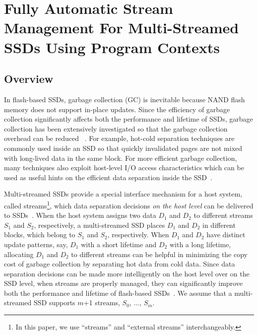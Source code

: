 \chapter{Fully Automatic Stream Management For Multi-Streamed SSDs Using Program Contexts} 
\label{chap:PCstream}

\section{Overview}

In flash-based SSDs, garbage collection (GC) is inevitable because NAND flash
memory does not support in-place updates.  Since the efficiency of garbage
collection significantly affects  both the performance and lifetime of SSDs,
garbage collection has been extensively investigated so that the garbage
collection overhead can be reduced ~\cite{DAC, WriteAmplification, GCGreedy,
GCVictim, GCTTFlash, HotCold}.  For example, hot-cold separation techniques are
commonly used inside an SSD so that quickly invalidated pages are not mixed
with long-lived data in the same block.   For more efficient garbage
collection, many techniques also exploit host-level I/O access characteristics
which can be used as useful hints on the efficient data separation inside the
SSD~\cite{JiTGC, ShadowGC}.

Multi-streamed SSDs provide a special interface mechanism for a host system,
called streams\footnote{In this paper, we use ``streams'' and ``external
streams'' interchangeably.}, which data separation decisions {\it on the
host level} can be delivered to SSDs~\cite{T10, MultiStream}.  When the host
system assigns two data $D_1$ and $D_2$ to different streams $S_1$ and $S_2$,
respectively, a multi-streamed SSD places $D_1$ and $D_2$ in different blocks,
which belong to $S_1$ and $S_2$, respectively.  When $D_1$ and $D_2$ have
distinct update patterns, say, $D_1$ with a short lifetime and $D_2$ with a
long lifetime, allocating $D_1$ and $D_2$ to different streams can be helpful
in minimizing the copy cost of garbage collection by separating hot data from
cold data.  Since data separation decisions can be made more intelligently on
the host level over on the SSD level, when streams are properly managed, they
can significantly improve both the performance and lifetime of flash-based
SSDs~\cite{MultiStream, Level,vStream, FStream, AutoStream}.  We assume that a
multi-streamed SSD supports $m$+1 streams, $S_0$, ..., $S_{m}$.

